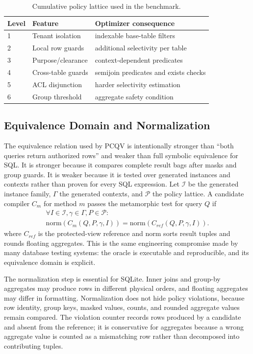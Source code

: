 \documentclass[conference]{IEEEtran}
\newcommand{\pcqv}{PCQV}
\newcommand{\ctx}{\gamma}
\begin{document}
\begin{table}[t]
\centering
\caption{Cumulative policy lattice used in the benchmark.}
\label{tab:lattice}
\begin{tabular}{p{}p{}p{}}
\toprule
Level & Feature & Optimizer consequence \\
\midrule
1 & Tenant isolation & indexable base-table filters \\
2 & Local row guards & additional selectivity per table \\
3 & Purpose/clearance & context-dependent predicates \\
4 & Cross-table guards & semijoin predicates and exists checks \\
5 & ACL disjunction & harder selectivity estimation \\
6 & Group threshold & aggregate safety condition \\
\bottomrule
\end{tabular}
\end{table}

\subsection{Equivalence Domain and Normalization}
The equivalence relation used by \pcqv{} is intentionally stronger than ``both queries return authorized rows'' and weaker than full symbolic equivalence for SQL. It is stronger because it compares complete result bags after masks and group guards. It is weaker because it is tested over generated instances and contexts rather than proven for every SQL expression. Let $\mathcal{I}$ be the generated instance family, $\Gamma$ the generated contexts, and $\mathcal{P}$ the policy lattice. A candidate compiler $C_m$ for method $m$ passes the metamorphic test for query $Q$ if
\begin{multline}
\forall I\in\mathcal{I},\ctx\in\Gamma,P\in\mathcal{P}:\;\\
\mathrm{norm}(C_m(Q,P,\ctx,I)) = \mathrm{norm}(C_{ref}(Q,P,\ctx,I)).
\end{multline}
where $C_{ref}$ is the protected-view reference and $\mathrm{norm}$ sorts result tuples and rounds floating aggregates. This is the same engineering compromise made by many database testing systems: the oracle is executable and reproducible, and its equivalence domain is explicit.

The normalization step is essential for SQLite. Inner joins and group-by aggregates may produce rows in different physical orders, and floating aggregates may differ in formatting. Normalization does not hide policy violations, because row identity, group keys, masked values, counts, and rounded aggregate values remain compared. The violation counter records rows produced by a candidate and absent from the reference; it is conservative for aggregates because a wrong aggregate value is counted as a mismatching row rather than decomposed into contributing tuples.
\end{document}
